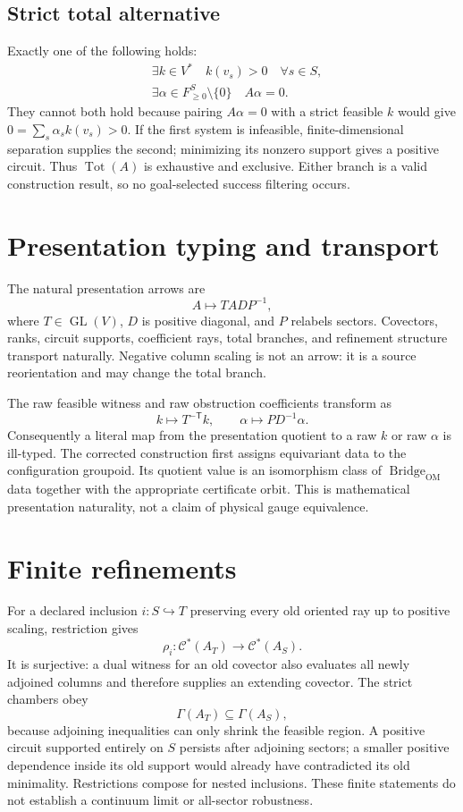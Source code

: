 \documentclass[11pt]{article}
\newcommand{\Cstar}{\mathcal{C}^{*}}
\newcommand{\Bridge}{\operatorname{Bridge}_{\mathrm{OM}}}
\begin{document}
\subsection{Strict total alternative}

Exactly one of the following holds:
\begin{align*}
 &\exists k\in V^*\quad k(v_s)>0\quad\forall s\in S,\\
 &\exists \alpha\in F^S_{\ge0}\setminus\{0\}\quad A\alpha=0.
\end{align*}
They cannot both hold because pairing $A\alpha=0$ with a strict feasible $k$
would give $0=\sum_s\alpha_s k(v_s)>0$.  If the first system is infeasible,
finite-dimensional separation supplies the second; minimizing its nonzero
support gives a positive circuit.  Thus $\operatorname{Tot}(A)$ is exhaustive
and exclusive.  Either branch is a valid construction result, so no
goal-selected success filtering occurs.

\section{Presentation typing and transport}

The natural presentation arrows are
\[
 A\longmapsto T A D P^{-1},
\]
where $T\in\operatorname{GL}(V)$, $D$ is positive diagonal, and $P$ relabels
sectors.  Covectors, ranks, circuit supports, coefficient rays, total branches,
and refinement structure transport naturally.  Negative column scaling is not
an arrow: it is a source reorientation and may change the total branch.

The raw feasible witness and raw obstruction coefficients transform as
\[
 k\longmapsto T^{-\mathsf T}k,
 \qquad
 \alpha\longmapsto P D^{-1}\alpha.
\]
Consequently a literal map from the presentation quotient to a raw $k$ or raw
$\alpha$ is ill-typed.  The corrected construction first assigns equivariant
data to the configuration groupoid.  Its quotient value is an isomorphism
class of $\Bridge$ data together with the appropriate certificate orbit.  This
is mathematical presentation naturality, not a claim of physical gauge
equivalence.

\section{Finite refinements}

For a declared inclusion $i:S\hookrightarrow T$ preserving every old oriented
ray up to positive scaling, restriction gives
\[
 \rho_i:\Cstar(A_T)\longrightarrow\Cstar(A_S).
\]
It is surjective: a dual witness for an old covector also evaluates all newly
adjoined columns and therefore supplies an extending covector.  The strict
chambers obey
\[
 \Gamma(A_T)\subseteq\Gamma(A_S),
\]
because adjoining inequalities can only shrink the feasible region.  A
positive circuit supported entirely on $S$ persists after adjoining sectors;
a smaller positive dependence inside its old support would already have
contradicted its old minimality.  Restrictions compose for nested inclusions.
These finite statements do not establish a continuum limit or all-sector
robustness.
\end{document}
